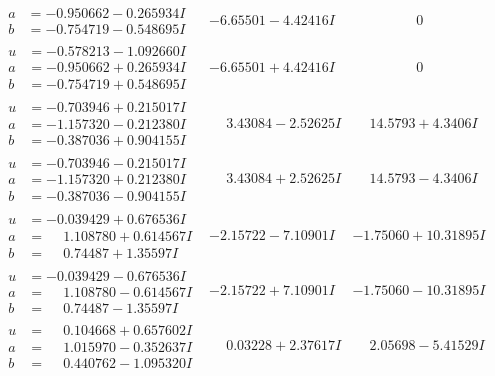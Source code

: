 \documentclass[1p]{elsarticle_modified}
\theoremstyle{definition}
\begin{document}
$$\begin{array}{c|c|c}
\begin{aligned}
a &= -0.950662 - 0.265934 I \\
b &= -0.754719 - 0.548695 I\end{aligned}
 & -6.65501 - 4.42416 I & \phantom{-0.000000 } 0 \\ \hline\begin{aligned}
u &= -0.578213 - 1.092660 I \\
a &= -0.950662 + 0.265934 I \\
b &= -0.754719 + 0.548695 I\end{aligned}
 & -6.65501 + 4.42416 I & \phantom{-0.000000 } 0 \\ \hline\begin{aligned}
u &= -0.703946 + 0.215017 I \\
a &= -1.157320 - 0.212380 I \\
b &= -0.387036 + 0.904155 I\end{aligned}
 & \phantom{-}3.43084 - 2.52625 I & \phantom{-}14.5793 + 4.3406 I \\ \hline\begin{aligned}
u &= -0.703946 - 0.215017 I \\
a &= -1.157320 + 0.212380 I \\
b &= -0.387036 - 0.904155 I\end{aligned}
 & \phantom{-}3.43084 + 2.52625 I & \phantom{-}14.5793 - 4.3406 I \\ \hline\begin{aligned}
u &= -0.039429 + 0.676536 I \\
a &= \phantom{-}1.108780 + 0.614567 I \\
b &= \phantom{-}0.74487 + 1.35597 I\end{aligned}
 & -2.15722 - 7.10901 I & -1.75060 + 10.31895 I \\ \hline\begin{aligned}
u &= -0.039429 - 0.676536 I \\
a &= \phantom{-}1.108780 - 0.614567 I \\
b &= \phantom{-}0.74487 - 1.35597 I\end{aligned}
 & -2.15722 + 7.10901 I & -1.75060 - 10.31895 I \\ \hline\begin{aligned}
u &= \phantom{-}0.104668 + 0.657602 I \\
a &= \phantom{-}1.015970 - 0.352637 I \\
b &= \phantom{-}0.440762 - 1.095320 I\end{aligned}
 & \phantom{-}0.03228 + 2.37617 I & \phantom{-}2.05698 - 5.41529 I \\ \hline\begin{aligned}

\end{aligned}
\end{array}$$
\end{document}
